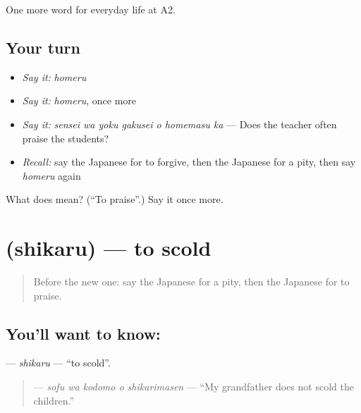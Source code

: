 \begin{grammarlens}[title={What you've built}]
One more word for everyday life at A2.
\end{grammarlens}

\subsection*{Your turn}
\begin{itemize}
\raggedright
  \item \emph{Say it:} \emph{homeru}
  \item \emph{Say it:} \emph{homeru}, once more
  \item \emph{Say it:} \emph{sensei wa yoku gakusei o homemasu ka} — Does the teacher often praise the students?
  \item \emph{Recall:} say the Japanese for to forgive, then the Japanese for a pity, then say \emph{homeru} again
\end{itemize}

\begin{tcolorbox}[breakable,colback=teal!4,colframe=teal!35!black,title={Before you move on}]
What does  mean? (\textquotedblleft{}To praise\textquotedblright{}.) Say it once more.
\end{tcolorbox}
\section[\texorpdfstring{\ja{しかる} (shikaru)}{しかる (shikaru)}]{ (shikaru) — to scold}

\label{lesson:JA-C247-shikaru}



\begin{quote}
Before the new one: say the Japanese for a pity, then the Japanese for to praise.
\end{quote}

\subsection*{You'll want to know: }
\textbf{} — \emph{shikaru} — \textquotedblleft{}to scold\textquotedblright{}.

\begin{quote}
\textbf{  } — \emph{sofu wa kodomo o shikarimasen} — \textquotedblleft{}My grandfather does not scold the children.\textquotedblright{}
\end{quote}

